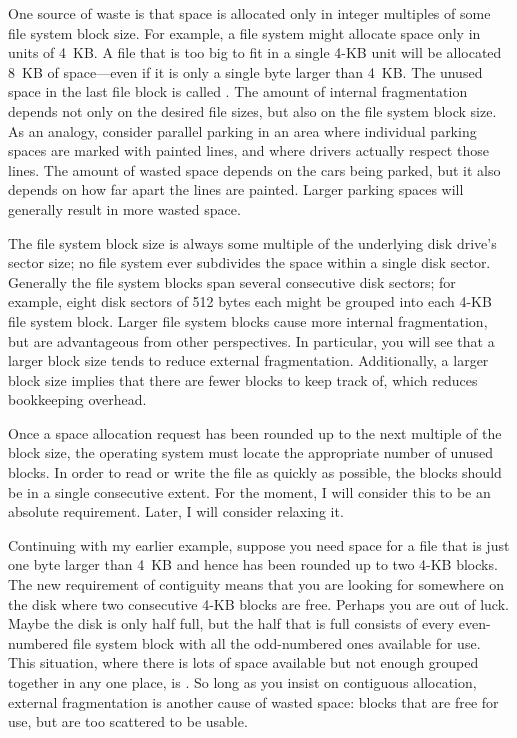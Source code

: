 One source of waste is that space is allocated only in integer
multiples of some file system block size.  For example, a file system
might allocate space only in units of 4~KB.  A file that is too big to
fit in a single 4-KB unit will be allocated 8~KB of space---even if it
is only a single byte larger than 4~KB.  The unused space in the last
file block is called .  The
amount of internal fragmentation depends not only on the desired file sizes,
but also on the file system block size.  As an analogy, consider
parallel parking in an area where individual parking spaces are marked
with painted lines, and where drivers actually respect those lines.
The amount of wasted space depends on the cars being parked, but it
also depends on how far apart the lines are painted.  Larger parking
spaces will generally result in more wasted space.

The file system block size is always some multiple of the underlying
disk drive's sector size; no file system ever subdivides the space
within a single disk sector.  Generally the file system blocks span
several consecutive disk sectors; for example, eight disk sectors of 512
bytes each might be grouped into each 4-KB file system block.  Larger
file system blocks cause more internal fragmentation, but are
advantageous from other perspectives.  In particular, you will see that
a larger block size tends to reduce
external fragmentation.
Additionally, a larger block size implies that there are fewer blocks
to keep track of, which reduces bookkeeping overhead.

Once a space allocation request has been rounded up to the next
multiple of the block size, the operating system must locate the
appropriate number of unused blocks.  In order to read or write the
file as quickly as possible, the blocks should be in a single
consecutive extent.  For the moment, I will consider this to be an
absolute requirement.  Later, I will consider relaxing it.

Continuing with my earlier example, suppose you need space for a file
that is just one byte larger than 4~KB and hence has been rounded up
to two 4-KB blocks.  The new requirement of contiguity means that you
are looking for somewhere on the disk where two consecutive 4-KB blocks
are free.  Perhaps you are out of luck.  Maybe the disk is only half
full, but the half that is full consists of every even-numbered file
system block with all the odd-numbered ones available for use.  This
situation, where there is lots of space available but not enough
grouped together in any one place, is .  So
long as you insist on contiguous allocation, external fragmentation is
another cause of wasted space: blocks that are free for use, but are
too scattered to be usable.

